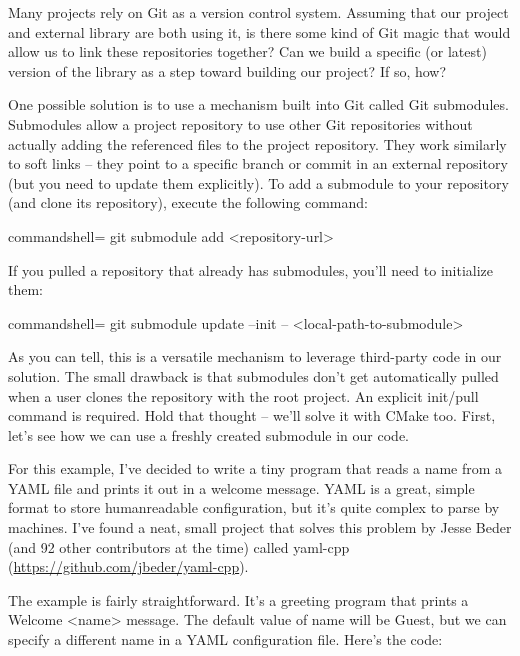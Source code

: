 
Many projects rely on Git as a version control system. Assuming that our project and external library are both using it, is there some kind of Git magic that would allow us to link these repositories together? Can we build a specific (or latest) version of the library as a step toward building our project? If so, how?


One possible solution is to use a mechanism built into Git called Git submodules. Submodules allow a project repository to use other Git repositories without actually adding the referenced files to the project repository. They work similarly to soft links – they point to a specific branch or commit in an external repository (but you need to update them explicitly). To add a submodule to your repository (and clone its repository), execute the following command:

\begin{tcblisting}{commandshell={}}
git submodule add <repository-url>
\end{tcblisting}

If you pulled a repository that already has submodules, you'll need to initialize them:

\begin{tcblisting}{commandshell={}}
git submodule update --init -- <local-path-to-submodule>
\end{tcblisting}

As you can tell, this is a versatile mechanism to leverage third-party code in our solution.
The small drawback is that submodules don't get automatically pulled when a user clones the repository with the root project. An explicit init/pull command is required. Hold that thought – we'll solve it with CMake too. First, let's see how we can use a freshly created submodule in our code.

For this example, I've decided to write a tiny program that reads a name from a YAML file and prints it out in a welcome message. YAML is a great, simple format to store humanreadable configuration, but it's quite complex to parse by machines. I've found a neat, small project that solves this problem by Jesse Beder (and 92 other contributors at the time) called yaml-cpp (\url{https://github.com/jbeder/yaml-cpp}).

The example is fairly straightforward. It's a greeting program that prints a Welcome <name> message. The default value of name will be Guest, but we can specify a different name in a YAML configuration file. Here's the code:

